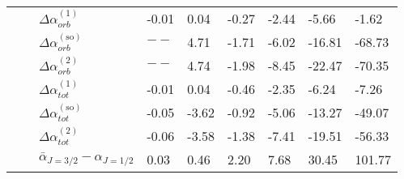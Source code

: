 \begin{longtable}{lllllllll}
      &       & $\Delta \alpha_{orb}^{(\text{1})}$ &       -0.01 &          0.04 &       -0.27 &     -2.44 &       -5.66 &       -1.62 \\
      &       & $\Delta \alpha_{orb}^{(\text{so})}$ &         $--$ &          4.71 &       -1.71 &     -6.02 &      -16.81 &      -68.73 \\
      &       & $\Delta \alpha_{orb}^{(\text{2})}$ &         $--$ &          4.74 &       -1.98 &     -8.45 &      -22.47 &      -70.35 \\
      &       & $\Delta \alpha_{tot}^{(\text{1})}$ &       -0.01 &          0.04 &       -0.46 &     -2.35 &       -6.24 &       -7.26 \\
      &       & $\Delta \alpha_{tot}^{(\text{so})}$ &       -0.05 &         -3.62 &       -0.92 &     -5.06 &      -13.27 &      -49.07 \\
      &       & $\Delta \alpha_{tot}^{(\text{2})}$ &       -0.06 &         -3.58 &       -1.38 &     -7.41 &      -19.51 &      -56.33 \\
      &       & $\bar{\alpha}_{J=3/2}-\alpha_{J=1/2}$ &        0.03 &          0.46 &        2.20 &      7.68 &       30.45 &      101.77 \\
\end{longtable}
